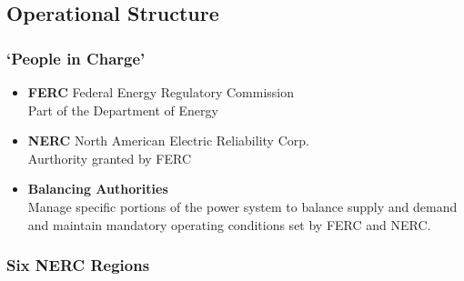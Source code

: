 \documentclass[14pt, unknownkeysallowed]{beamer}
\begin{document}
\subsection{Operational Structure}
\begin{frame}
\frametitle{`People in Charge'}
\begin{itemize}
\item \textbf{FERC}{ \footnotesize Federal Energy Regulatory Commission}\\
 Part of the Department of Energy
\item \textbf{NERC}{ \footnotesize
 North American Electric Reliability Corp.}\\
 Aurthority granted by FERC
 \item \textbf{Balancing Authorities} \\
 Manage specific portions of the power system to balance supply and demand and maintain mandatory operating conditions set by FERC and NERC. %
\end{itemize}
\end{frame}
\begin{frame}
\frametitle{Six NERC Regions}
\end{frame}
\end{document}
